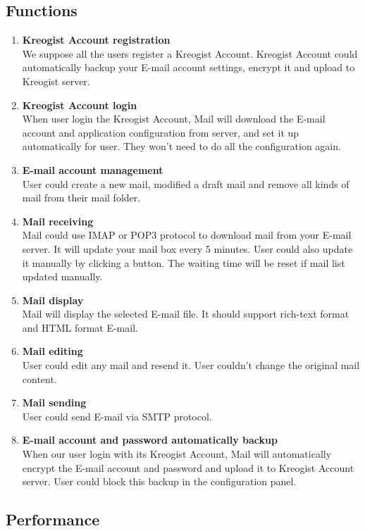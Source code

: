 \documentclass[11pt,a4paper]{article}
\begin{document}
        \subsection{Functions}
        	\begin{enumerate}
				\item {\textbf{Kreogist Account registration} \\
				       We suppose all the users register a Kreogist Account. Kreogist Account could automatically backup your E-mail account settings, encrypt it and upload to Kreogist server.}
				\item {\textbf{Kreogist Account login} \\
				       When user login the Kreogist Account, Mail will download the E-mail account and application configuration from server, and set it up automatically for user. They won't need to do all the configuration again.}
				\item {\textbf{E-mail account management} \\
				       User could create a new mail, modified a draft mail and remove all kinds of mail from their mail folder.}
				\item {\textbf{Mail receiving} \\
				       Mail could use IMAP or POP3 protocol to download mail from your E-mail server. It will update your mail box every 5 minutes. User could also update it manually by clicking a button. The waiting time will be reset if mail list updated manually.}
				\item {\textbf{Mail display} \\
				       Mail will display the selected E-mail file. It should support rich-text format and HTML format E-mail.}
				\item {\textbf{Mail editing} \\
				       User could edit any mail and resend it. User couldn't change the original mail content.}
				\item {\textbf{Mail sending} \\
				       User could send E-mail via SMTP protocol.}
				\item {\textbf{E-mail account and password automatically backup} \\
				       When our user login with its Kreogist Account, Mail will automatically encrypt the E-mail account and password and upload it to Kreogist Account server. User could block this backup in the configuration panel.}
			\end{enumerate}
        \subsection{Performance}
\end{document}
